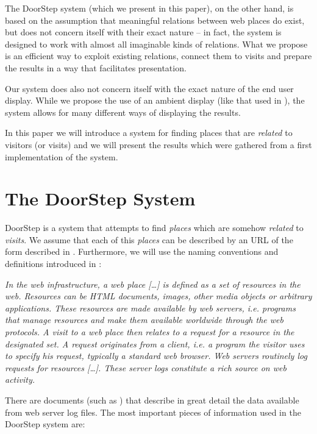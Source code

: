 \documentclass[a4paper]{danarticle}
\theoremstyle{remark}
\begin{document}
    The DoorStep system (which we present in this paper), 
    on the other hand, is based on the assumption that 
    meaningful relations between web places do exist, but does not concern itself 
    with their exact nature -- in fact, the system is designed 
    to work with almost all imaginable kinds of relations. What we propose is an 
    efficient way to exploit existing relations, connect them to visits 
    and prepare the results in a way that facilitates presentation.
    
    Our system does also not concern itself with the exact 
    nature of the end user display. While we propose the use of an ambient 
    display (like that used in \cite{ambient}), the system allows for many 
    different ways of displaying the results.
    
    In this paper we will introduce a system for finding places that are 
    \textit{related} to
    visitors (or visits) and we will present the results which were gathered 
    from a first implementation of the system.
  \section{The DoorStep System}
    DoorStep is a system that attempts to find \textit{places} which are somehow
    \textit{related} to \textit{visits}. We assume that each
    of this \textit{places} can be described by an URL of the form described in
    \cite{url}. Furthermore, we will use the naming conventions and definitions
    introduced in \cite{webaware}:
    \begin{center}
    \begin{minipage}{10cm}
    \itshape
    In the web infrastructure, a web place [\dots] is defined as 
    a set of resources in the web. Resources can
    be HTML documents, images, other media objects or arbitrary applications.
    These resources are made available by web servers, i.e. programs that manage
    resources and make them available worldwide through the web protocols. A
    visit to a web place then relates to a request for a resource in the
    designated set. A request originates from a client, i.e. a program the
    visitor uses to specify his request, typically a standard web browser. Web
    servers routinely log requests for resources [\dots]. These server logs
    constitute a rich source on web activity.
    \end{minipage}
    \end{center}
    There are documents (such as \cite{logfile}) that describe in great detail 
    the data available from web server log files. The most important pieces of
    information used in the DoorStep system are:
    \\
    
\end{document}
